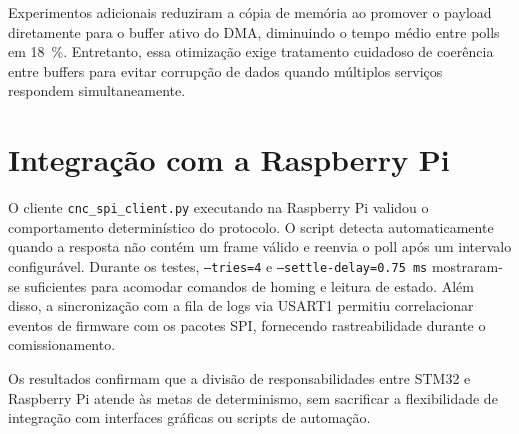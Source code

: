 Experimentos adicionais reduziram a cópia de memória ao promover o
payload diretamente para o buffer ativo do DMA, diminuindo o tempo médio
entre polls em \SI{18}{\percent}. Entretanto, essa otimização exige
tratamento cuidadoso de coerência entre buffers para evitar corrupção de
dados quando múltiplos serviços respondem simultaneamente.

\section{Integração com a Raspberry Pi}

O cliente \texttt{cnc\_spi\_client.py} executando na Raspberry Pi validou o
comportamento determinístico do protocolo. O script detecta automaticamente
quando a resposta não contém um frame válido e reenvia o poll após um
intervalo configurável. Durante os testes, \texttt{--tries=4} e
\texttt{--settle-delay=0.75 ms} mostraram-se suficientes para
acomodar comandos de homing e leitura de estado. Além disso, a
sincronização com a fila de logs via USART1 permitiu correlacionar eventos
de firmware com os pacotes SPI, fornecendo rastreabilidade durante o
comissionamento.

Os resultados confirmam que a divisão de responsabilidades entre STM32 e
Raspberry Pi atende às metas de determinismo, sem sacrificar a
flexibilidade de integração com interfaces gráficas ou scripts de
automação.
